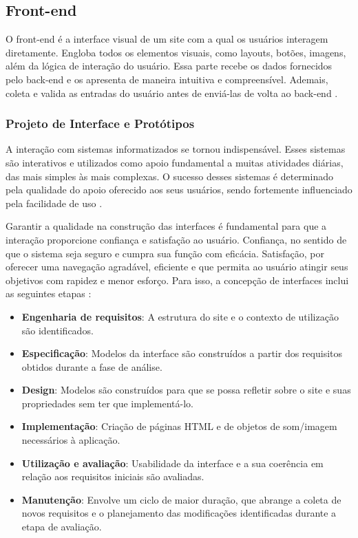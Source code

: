 \subsection{Front-end}

O front-end é a interface visual de um site com a qual os usuários interagem diretamente. Engloba todos os elementos visuais, como layouts, botões, imagens, além da lógica de interação do usuário. Essa parte recebe os dados fornecidos pelo back-end e os apresenta de maneira intuitiva e compreensível. Ademais, coleta e valida as entradas do usuário antes de enviá-las de volta ao back-end \cite{garcia2024plataforma}.

\subsubsection{Projeto de Interface e Protótipos}

A interação com sistemas informatizados se tornou indispensável. Esses sistemas são interativos e utilizados como apoio fundamental a muitas atividades diárias, das mais simples às mais complexas. O sucesso desses sistemas é determinado pela qualidade do apoio oferecido aos seus usuários, sendo fortemente influenciado pela facilidade de uso \cite{miletto2014desenvolvimento}.

Garantir a qualidade na construção das interfaces é fundamental para que a interação proporcione confiança e satisfação ao usuário. Confiança, no sentido de que o sistema seja seguro e cumpra sua função com eficácia. Satisfação, por oferecer uma navegação agradável, eficiente e que permita ao usuário atingir seus objetivos com rapidez e menor esforço. Para isso, a concepção de interfaces inclui as seguintes etapas \cite{miletto2014desenvolvimento}:
\begin{itemize}
    \item \textbf{Engenharia de requisitos}: A estrutura do site e o contexto de utilização são identificados.
    \item \textbf{Especificação}: Modelos da interface são construídos a partir dos requisitos obtidos durante a fase de análise.
    \item \textbf{Design}: Modelos são construídos para que se possa refletir sobre o site e suas propriedades sem ter que implementá-lo.
    \item \textbf{Implementação}: Criação de páginas HTML e de objetos de som/imagem necessários à aplicação.
    \item \textbf{Utilização e avaliação}: Usabilidade da interface e a sua coerência em relação aos requisitos iniciais são avaliadas.
    \item \textbf{Manutenção}: Envolve um ciclo de maior duração, que abrange a coleta de novos requisitos e o planejamento das modificações identificadas durante a etapa de avaliação.
\end{itemize}

